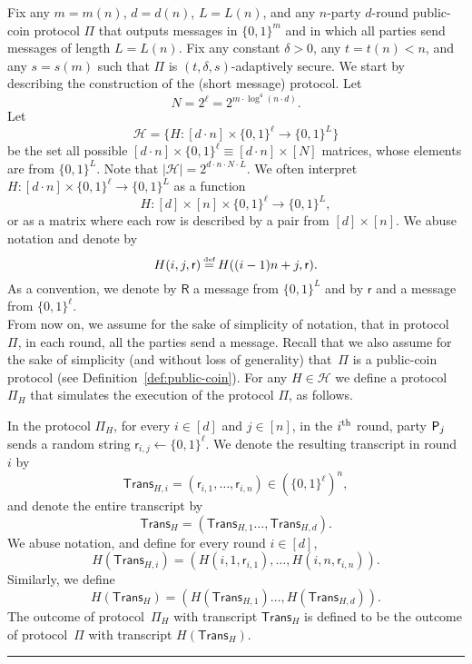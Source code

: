 \documentclass[11pt]{article}
\theoremstyle{plain}
\theoremstyle{definition}
\numberwithin{equation}{section}
\newcommand{\MyParagraph}[1]{\medskip \noindent {\bf #1}}
\renewcommand{\paragraph}{\MyParagraph}
\newcommand{\qedsymb}{\hfill{\rule{2mm}{2mm}}}
\renewenvironment{proof}{\begin{trivlist} \item[\hspace{\labelsep}{\bf
\noindent Proof.\/}] }{\qedsymb\end{trivlist}}
\numberwithin{equation}{section} \newcommand{\aka} {also known as\ }
\newcommand{\eqdef} {\mathrel{\stackrel{\makebox[0pt]{\mbox{\normalfont\tiny
def}}}{=}}}
\newcommand{\Hc}{\mathcal H}
\newcommand{\B}{\{ 0,1 \}}
\newcommand{\1}{\mathbf{1}}
\newcommand{\ith}[1]{{#1}\textsuperscript{th}}
\newcommand{\lo}{{\mathsf{R}}}
\newcommand{\sh}{{\mathsf{r}}}
\newcommand{\trans}{{\mathsf{Trans}}}
\theoremstyle{remark}
\begin{document}
 \begin{proof}

Fix any  $m=m(n)$, $d=d(n)$, $L=L(n)$,  and any $n$-party $d$-round public-coin
  protocol $\Pi$ that outputs messages in $\{0,1\}^m$ and in which all parties send
  messages of length $L=L(n)$. Fix any constant $\delta>0$, any $t=t(n)<n$, and any $s=s(m)$ such that $\Pi$ is $(t,\delta,s)$-adaptively secure. We start by describing the construction of the (short message) protocol. Let
\begin{equation}\label{eqn:N}
N=2^\ell=2^{m\cdot\log^4(n\cdot d)}.
\end{equation}
Let $$\Hc = \{H:[d\cdot n]\times\B^\ell\to\B^L\}$$ be the set all
possible $[d\cdot n]\times \B^\ell\equiv [d\cdot n]\times [N]$ matrices, whose elements are from $\B^L$.
Note that $|\Hc|= 2^{d\cdot n\cdot N\cdot L}$.   We often
interpret $H:[d\cdot n]\times\B^\ell\to\B^L$ as a function
$$H:[d]\times
[n]\times\B^\ell\to\B^L,
$$
or as a matrix where each row is described by a pair from $[d]\times[n]$.  We abuse notation and denote by
$$H(i,j,\sh)\eqdef H((i-1)n+j,\sh).$$
As a convention, we denote by $\lo$ a
message from $\B^L$ and by $\sh$ and a message from $\B^\ell$. \\

From now on, we assume for the sake of simplicity of notation, that in protocol~$\Pi$, in each round, all the parties send a message.
Recall that we also assume for the sake of simplicity (and without loss of
generality) that~$\Pi$ is a public-coin protocol (see
Definition~\ref{def:public-coin}). For any $H\in\Hc$ we define a protocol $\Pi_H$ that simulates the
execution of the protocol $\Pi$, as follows.

\paragraph{The Protocol~$\Pi_H$.}
In the protocol $\Pi_H$, for every $i\in[d]$ and $j\in[n]$,
in the $\ith{i}$ round, party $\mathsf{P}_{{j}}$ sends a random string $\sh_{i,j}\leftarrow\{0,1\}^\ell$.
We denote the resulting transcript in round $i$ by
$$
\trans_{H,i}=(\sh_{i,1},\ldots,\sh_{i,n})\in\left(\{0,1\}^{\ell}\right)^n,
$$
and denote the entire transcript  by
$$\trans_H=(\trans_{H,1}\ldots,\trans_{H,d}).
$$
We abuse notation, and define for every round $i\in[d]$,
$$
H(\trans_{H,i})=(H(i,1,\sh_{i,1}),\ldots,H(i,n,\sh_{i,n})).
$$
Similarly, we define
$$
H(\trans_H)=(H(\trans_{H,1})\ldots,H(\trans_{H,d})).
$$
The outcome of protocol~$\Pi_H$ with transcript $\trans_H$ is defined to be the outcome of protocol~$\Pi$ with transcript $H(\trans_H)$.\\


\end{proof}
\end{document}

